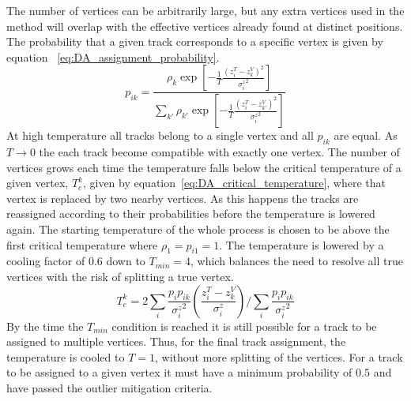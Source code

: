 The number of vertices can be arbitrarily large, but any extra vertices used in the method will overlap with the effective vertices already found at distinct positions.
The probability that a given track corresponds to a specific vertex is given by equation ~\ref{eq:DA_assignment_probability}.
\begin{equation}
    \label{eq:DA_assignment_probability}
    p_{ik}=\frac{\rho_{k}\exp\left[-\frac{1}{T}\frac{\left(z_{i}^{T}-z_{k}^{V}\right)^{2}}{{\sigma_{i}^{z}}^{2}}\right]}{\sum_{k'}\rho_{k'}\exp\left[-\frac{1}{T}\frac{\left(z_{i}^{T}-z_{k'}^{V}\right)^{2}}{{\sigma_{i}^{z}}^{2}}\right]}
\end{equation} 
At high temperature all tracks belong to a single vertex and all $p_{ik}$ are equal.
As $T\rightarrow0$ the each track become compatible with exactly one vertex.
The number of vertices grows each time the temperature falls below the critical temperature of a given vertex, $T_{c}^{k}$, given by equation~\ref{eq:DA_critical_temperature}, where that vertex is replaced by two nearby vertices.
As this happens the tracks are reassigned according to their probabilities before the temperature is lowered again.
The starting temperature of the whole process is chosen to be above the first critical temperature where $\rho_{1}=p_{i1}=1$.
The temperature is lowered by a cooling factor of 0.6 down to $T_{min}=4$, which balances the need to resolve all true vertices with the risk of splitting a true vertex.
\begin{equation}
    \label{eq:DA_critical_temperature}
    T_{c}^{k}=2\sum_{i}\frac{p_{i}p_{ik}}{{\sigma_{i}^{z}}^{2}}\left(\frac{z_{i}^{T}-z_{k}^{V}}{\sigma_{i}^{z}}\right)/\sum_{i}\frac{p_{i}p_{ik}}{{\sigma_{i}^{z}}^{2}}
\end{equation}
By the time the $T_{min}$ condition is reached it is still possible for a track to be assigned to multiple vertices.
Thus, for the final track assignment, the temperature is cooled to $T=1$, without more splitting of the vertices.
For a track to be assigned to a given vertex it must have a minimum probability of $0.5$ and have passed the outlier mitigation criteria.

